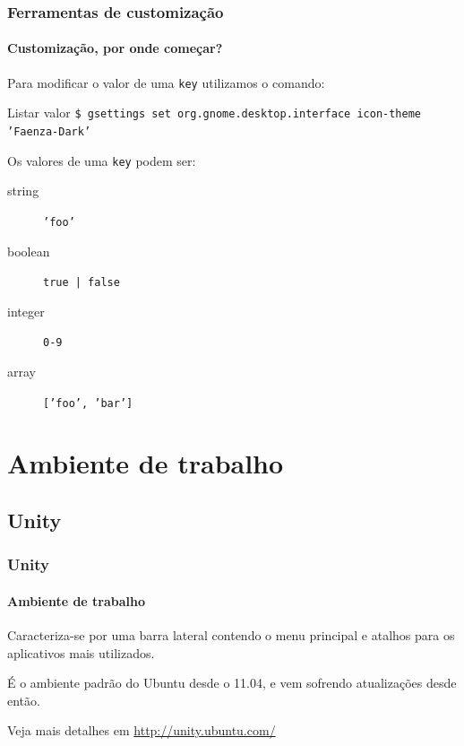 \begin{frame}\frametitle{Ferramentas de customização}\framesubtitle{Customização, por onde começar?}

Para modificar o valor de uma \texttt{key} utilizamos o comando:

\begin{block}{Listar valor}
\texttt{\$ gsettings set org.gnome.desktop.interface icon-theme 'Faenza-Dark'}
\end{block}

\medskip

Os valores de uma \texttt{key} podem ser:
\begin{description}
	\item[string] \texttt{'foo'}
	\item[boolean] \texttt{true | false}
	\item[integer] \texttt{0-9}
	\item[array] \texttt{['foo', 'bar']}
\end{description}

\end{frame}

\section{Ambiente de trabalho}

\begin{frame}


\end{frame}


\subsection{Unity}

\begin{frame}


\end{frame}

\begin{frame}\frametitle{Unity}\framesubtitle{Ambiente de trabalho}

Caracteriza-se por uma barra lateral contendo o menu principal e atalhos para os aplicativos
mais utilizados.

\medskip

É o ambiente padrão do Ubuntu desde o 11.04, e vem sofrendo atualizações desde então.

\medskip

Veja mais detalhes em \url{http://unity.ubuntu.com/}

\end{frame}

